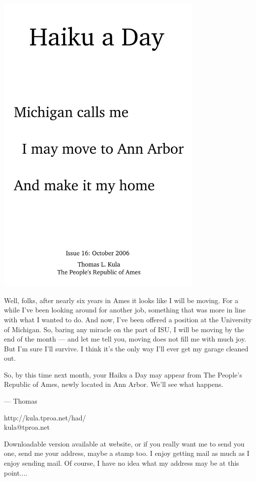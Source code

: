 \documentclass[12pt]{article}
\begin{document}
\includegraphics[width=101mm]{frontpage.png}

\newpage

Well, folks, after nearly six years in Ames it looks
like I will be moving. For a while I've been looking
around for another job, something that was more in 
line with what I wanted to do. And now, I've been
offered a position at the University of Michigan.
So, baring any miracle on the part of ISU, I will be
moving by the end of the month --- and let me tell
you, moving does not fill me with much joy. But I'm
sure I'll survive. I think it's the only way I'll
ever get my garage cleaned out.

So, by this time next month, your Haiku a Day may 
appear from The People's Republic of Ames, newly
located in Ann Arbor. We'll see what happens.

--- Thomas

http://kula.tproa.net/had/ \\
kula@tproa.net

Downloadable version available at website, or if you really
want me to send you one, send me your address, maybe a
stamp too. I enjoy getting mail as much as I enjoy sending
mail. Of course, I have no idea what my address may be at
this point....
\end{document}
